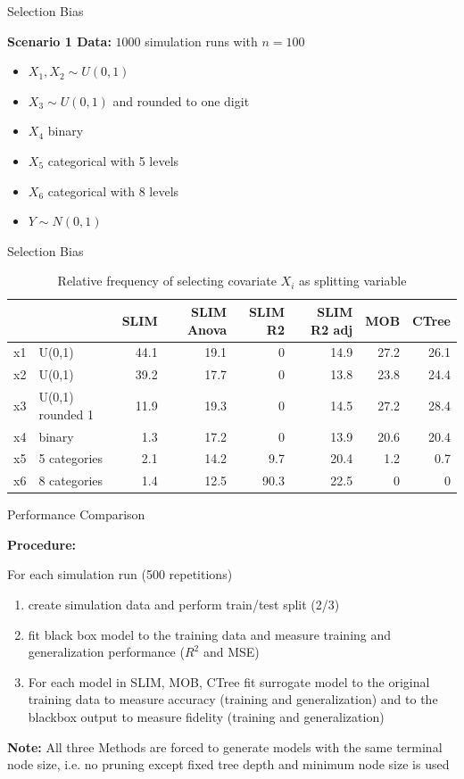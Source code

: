 \documentclass[9pt, xcolor=table]{beamer}
\begin{document}
\begin{frame}{Selection Bias}

\textbf{Scenario 1 Data:}  $1000$ simulation runs with $n= 100$
\begin{itemize}
    \item $X_{1}, X_{2} \sim U(0,1) $
    \item $X_{3} \sim U(0,1)$ and rounded to one digit
    \item $X_{4}$ binary
    \item $X_{5}$ categorical with 5 levels
    \item $X_{6}$ categorical with 8 levels
    \item $Y \sim N(0,1)$

\end{itemize}

\end{frame}
\begin{frame}{Selection Bias}
\begin{table}
\caption{Relative frequency of selecting covariate $X_i$ as splitting variable}

\centering
\begin{tabular}[t]{l|l|r|r|r|r|r|r}
\hline
  & & SLIM & SLIM Anova & SLIM R2 & SLIM R2 adj & MOB & CTree\\
\hline
x1 & U(0,1) & 44.1 & 19.1 & 0 & 14.9 & 27.2 & 26.1\\
x2 & U(0,1) & 39.2 & 17.7 & 0 & 13.8 & 23.8 & 24.4\\
x3 & U(0,1) rounded 1 & 11.9 & 19.3 & 0 & 14.5 & 27.2 & 28.4\\
x4 & binary & 1.3 & 17.2 & 0 & 13.9 & 20.6 & 20.4\\
x5 & 5 categories & 2.1 & 14.2 & 9.7 & 20.4 & 1.2 & 0.7\\
x6 & 8 categories & 1.4 & 12.5 & 90.3 & 22.5 & 0 & 0\\
\hline
\end{tabular}
\end{table}
\end{frame}

\begin{frame}{Performance Comparison}


\textbf{Procedure:} 

For each simulation run (500 repetitions)
\begin{enumerate}
    \item create simulation data and perform train/test split (2/3)
    \item fit black box model to the training data and measure training and generalization performance ($R^2$ and MSE)
    \item For each model in SLIM, MOB, CTree fit surrogate model to the original training data to measure accuracy (training and generalization) and to the blackbox output to measure fidelity (training and generalization)
\end{enumerate}

\textbf{Note:} All three Methods are forced to generate models with the same terminal node size, i.e. no pruning except fixed tree depth and minimum node size is used

\end{frame}
\end{document}
